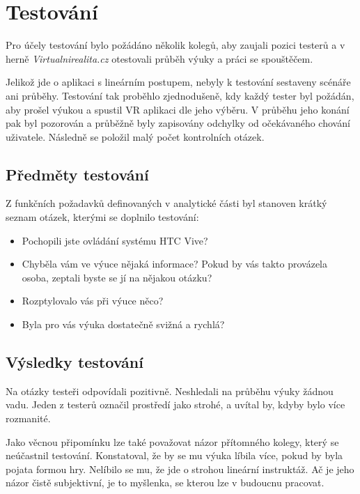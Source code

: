 \chapter{Testování}\label{testovuxe1nuxed}

Pro účely testování bylo požádáno několik kolegů, aby zaujali pozici
testerů a v herně \emph{Virtualnirealita.cz} otestovali průběh výuky a
práci se spouštěčem.

Jelikož jde o aplikaci s lineárním postupem, nebyly k testování
sestaveny scénáře ani průběhy. Testování tak proběhlo zjednodušeně, kdy
každý tester byl požádán, aby prošel výukou a spustil VR aplikaci dle
jeho výběru. V průběhu jeho konání pak byl pozorován a průběžně
byly zapisovány odchylky od očekávaného chování uživatele. Následně se 
položil malý počet kontrolních otázek.

\section{Předměty testování}\label{pux159edmux11bty-testovuxe1nuxed}

Z funkčních požadavků definovaných v analytické části byl stanoven
krátký seznam otázek, kterými se doplnilo testování:

\begin{itemize}
  \item
    Pochopili jste ovládání systému HTC Vive?
  \item
    Chyběla vám ve výuce nějaká informace? Pokud by vás takto provázela osoba,
    zeptali byste se jí na nějakou otázku?
  \item
    Rozptylovalo vás při výuce něco?
  \item
    Byla pro vás výuka dostatečně svižná a rychlá?
\end{itemize}
    
\section{Výsledky testování}\label{vysledky-testovani}

Na otázky testeři odpovídali pozitivně. Neshledali na průběhu výuky
žádnou vadu. Jeden z testerů označil prostředí jako strohé, a uvítal by,
kdyby bylo více rozmanité.

Jako věcnou připomínku lze také považovat názor přítomného kolegy, který se
neúčastnil testování. Konstatoval, že by se mu výuka líbila více, pokud by byla
pojata formou hry. Nelíbilo se mu, že jde o strohou lineární instruktáž. Ač je
jeho názor čistě subjektivní, je to myšlenka, se kterou lze v budoucnu pracovat.


